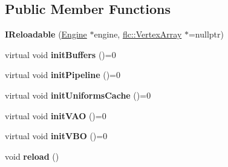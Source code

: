\subsection*{Public Member Functions}
\begin{DoxyCompactItemize}
\item 
{\bfseries I\+Reloadable} (\hyperlink{classflw_1_1Engine}{Engine} $\ast$engine, \hyperlink{classflw_1_1flc_1_1VertexArray}{flc\+::\+Vertex\+Array} $\ast$=nullptr)\hypertarget{classflw_1_1flf_1_1IReloadable_ac731f61c6d138b0edcfaedbbfdaa532b}{}\label{classflw_1_1flf_1_1IReloadable_ac731f61c6d138b0edcfaedbbfdaa532b}

\item 
virtual void {\bfseries init\+Buffers} ()=0\hypertarget{classflw_1_1flf_1_1IReloadable_a8f95c0f4b89e86f07e5b84b920b52de5}{}\label{classflw_1_1flf_1_1IReloadable_a8f95c0f4b89e86f07e5b84b920b52de5}

\item 
virtual void {\bfseries init\+Pipeline} ()=0\hypertarget{classflw_1_1flf_1_1IReloadable_a955cc317fbf1e974c9721eba63d8b925}{}\label{classflw_1_1flf_1_1IReloadable_a955cc317fbf1e974c9721eba63d8b925}

\item 
virtual void {\bfseries init\+Uniforms\+Cache} ()=0\hypertarget{classflw_1_1flf_1_1IReloadable_aaa10b7aa64b43307022ea9c96a3745d5}{}\label{classflw_1_1flf_1_1IReloadable_aaa10b7aa64b43307022ea9c96a3745d5}

\item 
virtual void {\bfseries init\+V\+AO} ()=0\hypertarget{classflw_1_1flf_1_1IReloadable_ab7a74ae62026efd9a7c84285a2dda781}{}\label{classflw_1_1flf_1_1IReloadable_ab7a74ae62026efd9a7c84285a2dda781}

\item 
virtual void {\bfseries init\+V\+BO} ()=0\hypertarget{classflw_1_1flf_1_1IReloadable_a93e45b66f1029e5fd95174b68fbc1114}{}\label{classflw_1_1flf_1_1IReloadable_a93e45b66f1029e5fd95174b68fbc1114}

\item 
void {\bfseries reload} ()\hypertarget{classflw_1_1flf_1_1IReloadable_a406820dd9f7ef66ca0df0dda52f666cd}{}\label{classflw_1_1flf_1_1IReloadable_a406820dd9f7ef66ca0df0dda52f666cd}

\end{DoxyCompactItemize}

